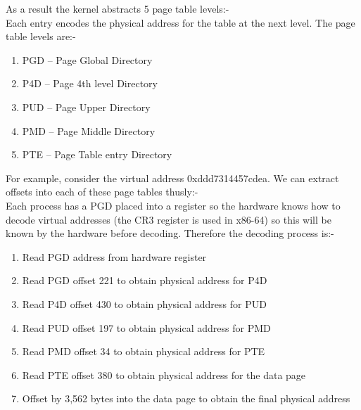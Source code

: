 As a result the kernel abstracts 5 page table levels:-\\



Each entry encodes the physical address for the table at the next level. The
page table levels are:-\\
\clearpage

\begin{enumerate}
\item PGD -- Page Global Directory
\item P4D -- Page 4th level Directory
\item PUD -- Page Upper Directory
\item PMD -- Page Middle Directory
\item PTE -- Page Table entry Directory
\end{enumerate}

For example, consider the virtual address 0xddd7314457cdea. We can extract
offsets into each of these page tables thusly:-\\



Each process has a PGD placed into a register so the hardware knows how to
decode virtual addresses (the CR3 register is used in x86-64) so this will be
known by the hardware before decoding. Therefore the decoding process is:-

\begin{enumerate}
\item Read PGD address from hardware register
\item Read PGD offset 221 to obtain physical address for P4D
\item Read P4D offset 430 to obtain physical address for PUD
\item Read PUD offset 197 to obtain physical address for PMD
\item Read PMD offset 34 to obtain physical address for PTE
\item Read PTE offset 380 to obtain physical address for the data page
\item Offset by 3,562 bytes into the data page to obtain the final physical address
\end{enumerate}

